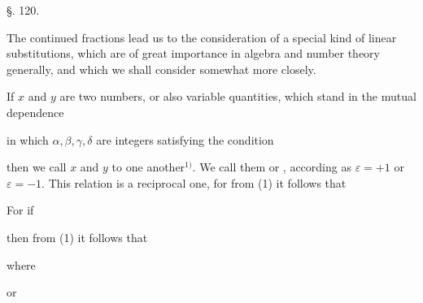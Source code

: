 
\begin{center}
§. 120.

\end{center}

The continued fractions lead us to the consideration of a
special kind of linear substitutions, which are of great importance
in algebra and number theory generally, and which we shall
consider somewhat more closely.

If $x$ and $y$ are two numbers, or also variable quantities,
which stand in the mutual dependence

in which $\alpha, \beta, \gamma, \delta$ are integers satisfying the condition

then we call $x$ and $y$  to one another$^{1)}$.
We call them  or ,
according as $\varepsilon = +1$ or $\varepsilon = -1$. This relation is
a reciprocal one, for from (1) it follows that


For if

then from (1) it follows that

where

or

\begingroup
\renewcommand{\thefootnote}{1)}
\endgroup

